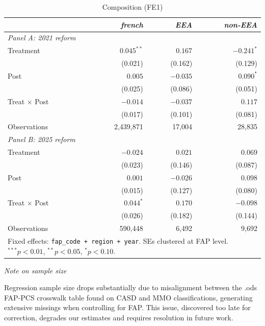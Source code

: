 \documentclass[10pt, a4paper]{article}
\begin{document}
\begin{table}[h!]
\caption{Composition (FE1)\label{tab:selection}}
\centering
\setlength{\tabcolsep}{25pt}
\begin{tabular}{lrrr}
 & \textit{french} & \textit{EEA} & \textit{non-EEA} \\
\midrule
\multicolumn{4}{l}{\textit{Panel A: 2021 reform}} \\[3pt]
Treatment & $0.045^{**}$ & $0.167$ & $-0.241^{*}$ \\
 & (0.021) & (0.162) & (0.129) \\[2pt]
Post & $0.005$ & $-0.035$ & $0.090^{*}$ \\
 & (0.025) & (0.086) & (0.051) \\[2pt]
Treat$\,\times\,$Post & $-0.014$ & $-0.037$ & $0.117$ \\
 & (0.017) & (0.101) & (0.081) \\[2pt]
\midrule
Observations & 2{,}439{,}871 & 17{,}004 & 28{,}835 \\
\midrule
\multicolumn{4}{l}{\textit{Panel B: 2025 reform}} \\[3pt]
Treatment & $-0.024$ & $0.021$ & $0.069$ \\
 & (0.023) & (0.146) & (0.087) \\[2pt]
Post & $0.001$ & $-0.026$ & $0.098$ \\
 & (0.015) & (0.127) & (0.080) \\[2pt]
Treat$\,\times\,$Post & $0.044^{*}$ & $0.170$ & $-0.098$ \\
 & (0.026) & (0.182) & (0.144) \\[2pt]
\midrule
Observations & 590{,}448 & 6{,}492 & 9{,}692 \\
\bottomrule
\multicolumn{4}{p{0.60\linewidth}}{\footnotesize Fixed effects: \texttt{fap\_code + region + year}. SEs clustered at FAP level. $^{***}p<0.01$, $^{**}p<0.05$, $^{*}p<0.10$.}\\
\end{tabular}
\end{table}

\medskip
\clearpage

\noindent \textit{Note on sample size}

\noindent Regression sample size drops substantially due to misalignment between the .ods FAP-PCS crosswalk table found on CASD and MMO classifications, generating extensive missings when controlling for FAP. This issue, discovered too late for correction, degrades our estimates and requires resolution in  future work.
\end{document}

